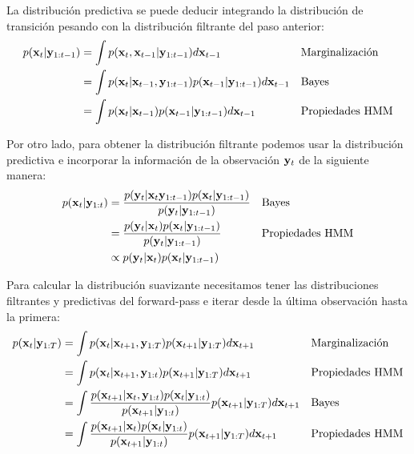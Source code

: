 La distribución predictiva se puede deducir integrando la distribución de transición pesando con la distribución filtrante del paso anterior:
\begin{align}
    p(\mathbf{x}_t | \mathbf{y}_{1:t-1}) &= \int p(\mathbf{x}_t, \mathbf{x}_{t-1} | \mathbf{y}_{1:t-1}) d\mathbf{x}_{t-1} && \text{Marginalización}\\
    &= \int p(\mathbf{x}_t | \mathbf{x}_{t-1}, \mathbf{y}_{1:t-1}) p(\mathbf{x}_{t-1} | \mathbf{y}_{1:t-1}) d\mathbf{x}_{t-1} && \text{Bayes}\\
    &=\int p(\mathbf{x}_t | \mathbf{x}_{t-1}) p(\mathbf{x}_{t-1} | \mathbf{y}_{1:t-1}) d\mathbf{x}_{t-1} && \text{Propiedades HMM}
\end{align}

Por otro lado, para obtener la distribución filtrante podemos usar la distribución predictiva e incorporar la información de la observación $\mathbf{y}_t$ de la siguiente manera:
\begin{align}
    p(\mathbf{x}_t | \mathbf{y}_{1:t}) &= \frac
            {p(\mathbf{y}_t | \mathbf{x}_t \mathbf{y}_{1:t-1}) p(\mathbf{x}_t | \mathbf{y}_{1:t-1})}
            {p(\mathbf{y}_t | \mathbf{y}_{1:t-1})} && \text{Bayes}\\
    &= \frac{p(\mathbf{y}_t | \mathbf{x}_t) p(\mathbf{x}_t | \mathbf{y}_{1:t-1})}
            {p(\mathbf{y}_t | \mathbf{y}_{1:t-1})} && \text{Propiedades HMM} \label{eq:forward_backward_filter_complete}\\
    &\propto p(\mathbf{y}_t | \mathbf{x}_t) p(\mathbf{x}_t | \mathbf{y}_{1:t-1})
\end{align}

Para calcular la distribución suavizante necesitamos tener las distribuciones filtrantes y predictivas del forward-pass e iterar desde la última observación hasta la primera:
\begin{align}
    p(\mathbf{x}_t | \mathbf{y}_{1:T}) &= 
        \int p(\mathbf{x}_t | \mathbf{x}_{t+1}, \mathbf{y}_{1:T})
             p(\mathbf{x}_{t+1} | \mathbf{y}_{1:T}) d\mathbf{x}_{t+1}
        && \text{Marginalización} \\
    &= \int p(\mathbf{x}_t | \mathbf{x}_{t+1}, \mathbf{y}_{1:t})
             p(\mathbf{x}_{t+1} | \mathbf{y}_{1:T}) d\mathbf{x}_{t+1}
        && \text{Propiedades HMM} \\
    &= \int \frac{p(\mathbf{x}_{t+1} | \mathbf{x}_t, \mathbf{y}_{1:t})p(\mathbf{x}_t |\mathbf{y}_{1:t})}
            {p(\mathbf{x}_{t+1} |\mathbf{y}_{1:t})}
            p(\mathbf{x}_{t+1} | \mathbf{y}_{1:T}) d\mathbf{x}_{t+1}
        && \text{Bayes} \\
    &= \int \frac{p(\mathbf{x}_{t+1} | \mathbf{x}_t)p(\mathbf{x}_t |\mathbf{y}_{1:t})}
            {p(\mathbf{x}_{t+1} |\mathbf{y}_{1:t})}
            p(\mathbf{x}_{t+1} | \mathbf{y}_{1:T}) d\mathbf{x}_{t+1}
        && \text{Propiedades HMM}
\end{align}

